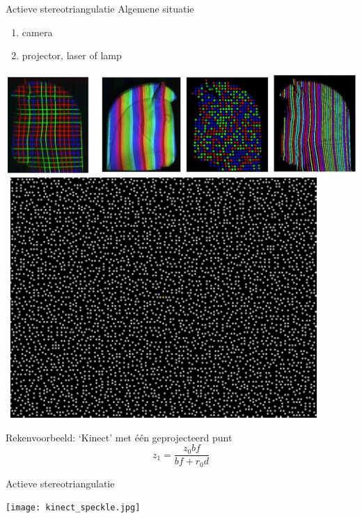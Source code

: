 \begin{frame}{Actieve stereotriangulatie}{}
{\large Algemene situatie}
\begin{enumerate}
\item camera
\item projector, laser of lamp
\end{enumerate}
\vfill
\pause
\centerline{\includegraphics[scale=0.17]{structuredlight.jpg}\, \includegraphics[scale=1, clip=true, viewport= 0 0 80 63]{kinect-pattern}}
\vfill
\pause
{\large Rekenvoorbeeld: `Kinect' met \'e\'en geprojecteerd punt}
\pause
$$
z_1 = \frac {z_0bf}{bf + r_0d}
$$
\end{frame}

\begin{frame}{Actieve stereotriangulatie}\vspace{-4pt}
\centerline{\texttt{[image: kinect\_speckle.jpg]}}
\end{frame}


